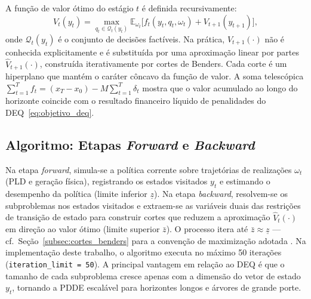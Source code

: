 A fun\c{c}\~ao de valor \'otimo do est\'agio $t$ \'e definida recursivamente:
%
\begin{equation}
  V_t(y_t) = \max_{q_t \in \mathcal{Q}_t(y_t)}
  \mathbb{E}_{\omega_t}\bigl[f_t(y_t, q_t, \omega_t)
  + V_{t+1}(y_{t+1})\bigr],
  \label{eq:funcao_valor}
\end{equation}
%
onde $\mathcal{Q}_t(y_t)$ \'e o conjunto de decis\~oes fact\'iveis. Na pr\'atica, $V_{t+1}(\cdot)$ n\~ao \'e conhecida explicitamente e \'e substitu\'ida por uma aproxima\c{c}\~ao linear por partes $\hat{V}_{t+1}(\cdot)$, constru\'ida iterativamente por cortes de Benders. Cada corte \'e um hiperplano que mant\'em o car\'ater c\^oncavo da fun\c{c}\~ao de valor. A soma telesc\'opica $\sum_{t=1}^{T} f_t = (x_T - x_0) - M\sum_{t=1}^{T}\delta_t$ mostra que o valor acumulado ao longo do horizonte coincide com o resultado financeiro l\'iquido de penalidades do DEQ~\eqref{eq:objetivo_deq}.

\subsection{Algoritmo: Etapas \textit{Forward} e \textit{Backward}}
\label{subsec:forward_backward}

Na etapa \textit{forward}, simula-se a pol\'itica corrente sobre trajet\'orias de realiza\c{c}\~oes $\omega_t$ (PLD e gera\c{c}\~ao f\'isica), registrando os estados visitados $y_t$ e estimando o desempenho da pol\'itica (limite inferior $\underline{z}$). Na etapa \textit{backward}, resolvem-se os subproblemas nos estados visitados e extraem-se as vari\'aveis duais das restri\c{c}\~oes de transi\c{c}\~ao de estado para construir cortes que reduzem a aproxima\c{c}\~ao $\hat{V}_t(\cdot)$ em dire\c{c}\~ao ao valor \'otimo (limite superior $\bar{z}$). O processo itera at\'e $\bar{z} \approx \underline{z}$ --- cf.\ Se\c{c}\~ao~\ref{subsec:cortes_benders} para a conven\c{c}\~ao de maximiza\c{c}\~ao adotada \cite{pereira1991}. Na implementa\c{c}\~ao deste trabalho, o algoritmo executa no m\'aximo 50 itera\c{c}\~oes (\texttt{iteration\_limit = 50}). A principal vantagem em rela\c{c}\~ao ao DEQ \'e que o tamanho de cada subproblema cresce apenas com a dimens\~ao do vetor de estado $y_t$, tornando a PDDE escal\'avel para horizontes longos e \'arvores de grande porte.
